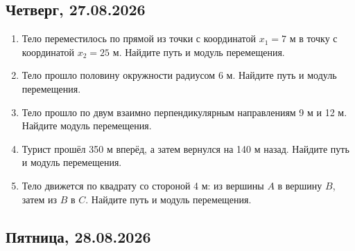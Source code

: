 \documentclass[a4paper,12pt]{article}
\begin{document}

\subsection*{\textcolor{darkaccent}{Четверг, 27.08.2026}}

\begin{enumerate}[label=\arabic*.]

\item
Тело переместилось по прямой
из точки с координатой $x_1=7$ м
в точку с координатой $x_2=25$ м.
Найдите путь и модуль перемещения.

\item
Тело прошло половину окружности радиусом 6 м.
Найдите путь и модуль перемещения.

\item
Тело прошло по двум взаимно перпендикулярным
направлениям 9 м и 12 м.
Найдите модуль перемещения.

\item
Турист прошёл 350 м вперёд,
а затем вернулся на 140 м назад.
Найдите путь и модуль перемещения.

\item
Тело движется по квадрату со стороной 4 м:
из вершины $A$ в вершину $B$,
затем из $B$ в $C$.
Найдите путь и модуль перемещения.

\end{enumerate}


\subsection*{\textcolor{darkaccent}{Пятница, 28.08.2026}}
\end{document}
